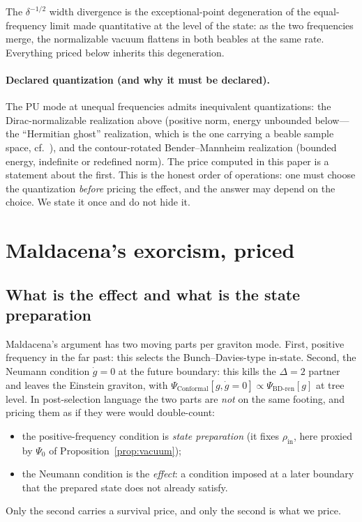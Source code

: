 \documentclass[11pt]{article}
\theoremstyle{definition}
\theoremstyle{remark}
\begin{document}
The $\delta^{-1/2}$ width divergence is the exceptional-point
degeneration of the equal-frequency limit made quantitative at the
level of the state: as the two frequencies merge, the normalizable
vacuum flattens in both beables at the same rate. Everything priced
below inherits this degeneration.

\paragraph{Declared quantization (and why it must be declared).}
The PU mode at unequal frequencies admits inequivalent quantizations:
the Dirac-normalizable realization above (positive norm, energy
unbounded below---the ``Hermitian ghost'' realization, which is the
one carrying a beable sample space, cf.\ \cite{choosing}), and the
contour-rotated Bender--Mannheim realization (bounded energy,
indefinite or redefined norm). The price computed in this paper is a
statement about the first. This is the honest order of operations:
one must choose the quantization \emph{before} pricing the effect,
and the answer may depend on the choice. We state it once and do not
hide it.

\section{Maldacena's exorcism, priced}
\label{sec:maldacena}

\subsection{What is the effect and what is the state preparation}
\label{sec:effect}

Maldacena's argument \cite{Maldacena2011} has two moving parts per
graviton mode. First, positive frequency in the far past: this
selects the Bunch--Davies-type in-state. Second, the Neumann
condition $\dot g=0$ at the future boundary: this kills the
$\Delta=2$ partner and leaves the Einstein graviton, with
$\Psi_{\mathrm{Conformal}}[g,\dot g=0]
\propto\Psi_{\mathrm{BD\text{-}ren}}[g]$ at tree level. In
post-selection language the two parts are \emph{not} on the same
footing, and pricing them as if they were would double-count:
\begin{itemize}
\item the positive-frequency condition is \emph{state preparation}
(it fixes $\rho_{\mathrm{in}}$, here proxied by
$\Psi_{0}$ of Proposition~\ref{prop:vacuum});
\item the Neumann condition is the \emph{effect}: a condition imposed
at a later boundary that the prepared state does not already satisfy.
\end{itemize}
Only the second carries a survival price, and only the second is what
we price.
\end{document}
